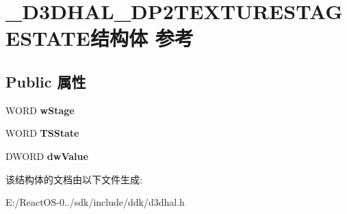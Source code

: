 \hypertarget{struct___d3_d_h_a_l___d_p2_t_e_x_t_u_r_e_s_t_a_g_e_s_t_a_t_e}{}\section{\+\_\+\+D3\+D\+H\+A\+L\+\_\+\+D\+P2\+T\+E\+X\+T\+U\+R\+E\+S\+T\+A\+G\+E\+S\+T\+A\+T\+E结构体 参考}
\label{struct___d3_d_h_a_l___d_p2_t_e_x_t_u_r_e_s_t_a_g_e_s_t_a_t_e}
\subsection*{Public 属性}
\begin{DoxyCompactItemize}
\item 
\mbox{\label{struct___d3_d_h_a_l___d_p2_t_e_x_t_u_r_e_s_t_a_g_e_s_t_a_t_e_a92db45a3af4e0a2eb5a1ed09490290ab}} 
W\+O\+RD {\bfseries w\+Stage}
\item 
\mbox{\label{struct___d3_d_h_a_l___d_p2_t_e_x_t_u_r_e_s_t_a_g_e_s_t_a_t_e_ab16861beb3c6528d1ed58870391914f7}} 
W\+O\+RD {\bfseries T\+S\+State}
\item 
\mbox{\label{struct___d3_d_h_a_l___d_p2_t_e_x_t_u_r_e_s_t_a_g_e_s_t_a_t_e_a9df8cbd5fff1f09a2a01a59f50fbfcba}} 
D\+W\+O\+RD {\bfseries dw\+Value}
\end{DoxyCompactItemize}


该结构体的文档由以下文件生成\+:\begin{DoxyCompactItemize}
\item 
E\+:/\+React\+O\+S-\/0../sdk/include/ddk/d3dhal.\+h\end{DoxyCompactItemize}
